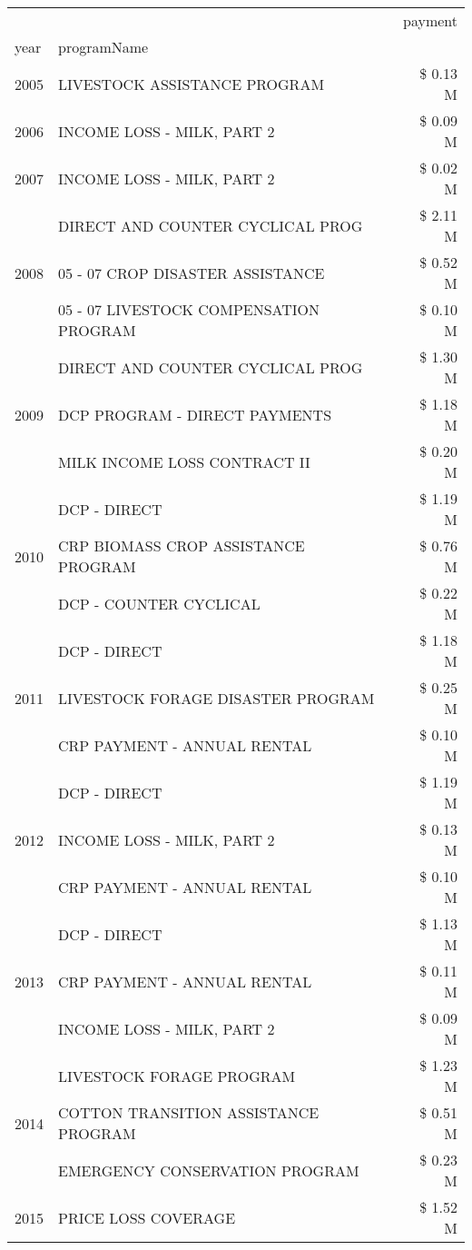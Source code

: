 \begin{tabular}{llr}
\toprule
 &  & payment \\
year & programName &  \\
\midrule
2005 & LIVESTOCK ASSISTANCE PROGRAM & \$ 0.13 M \\
\cline{1-3}
2006 & INCOME LOSS - MILK, PART 2 & \$ 0.09 M \\
\cline{1-3}
2007 & INCOME LOSS - MILK, PART 2 & \$ 0.02 M \\
\cline{1-3}
\multirow[t]{3}{*}{2008} & DIRECT AND COUNTER CYCLICAL PROG & \$ 2.11 M \\
 & 05 - 07 CROP DISASTER ASSISTANCE & \$ 0.52 M \\
 & 05 - 07 LIVESTOCK COMPENSATION PROGRAM & \$ 0.10 M \\
\cline{1-3}
\multirow[t]{3}{*}{2009} & DIRECT AND COUNTER CYCLICAL PROG & \$ 1.30 M \\
 & DCP PROGRAM - DIRECT PAYMENTS & \$ 1.18 M \\
 & MILK INCOME LOSS CONTRACT II & \$ 0.20 M \\
\cline{1-3}
\multirow[t]{3}{*}{2010} & DCP - DIRECT & \$ 1.19 M \\
 & CRP BIOMASS CROP ASSISTANCE PROGRAM & \$ 0.76 M \\
 & DCP - COUNTER CYCLICAL & \$ 0.22 M \\
\cline{1-3}
\multirow[t]{3}{*}{2011} & DCP - DIRECT & \$ 1.18 M \\
 & LIVESTOCK FORAGE DISASTER PROGRAM & \$ 0.25 M \\
 & CRP PAYMENT - ANNUAL RENTAL & \$ 0.10 M \\
\cline{1-3}
\multirow[t]{3}{*}{2012} & DCP - DIRECT & \$ 1.19 M \\
 & INCOME LOSS - MILK, PART 2 & \$ 0.13 M \\
 & CRP PAYMENT - ANNUAL RENTAL & \$ 0.10 M \\
\cline{1-3}
\multirow[t]{3}{*}{2013} & DCP - DIRECT & \$ 1.13 M \\
 & CRP PAYMENT - ANNUAL RENTAL & \$ 0.11 M \\
 & INCOME LOSS - MILK, PART 2 & \$ 0.09 M \\
\cline{1-3}
\multirow[t]{3}{*}{2014} & LIVESTOCK FORAGE PROGRAM & \$ 1.23 M \\
 & COTTON TRANSITION ASSISTANCE PROGRAM & \$ 0.51 M \\
 & EMERGENCY CONSERVATION PROGRAM & \$ 0.23 M \\
\cline{1-3}
\multirow[t]{3}{*}{2015} & PRICE LOSS COVERAGE & \$ 1.52 M \\

\end{tabular}
